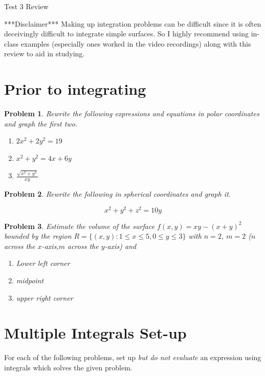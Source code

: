 \documentclass[11pt]{article}
\newtheorem{problem}{Problem}
\newcommand{\vs}{\vspace*{.1in}}
\begin{document}
\begin{huge}
    \begin{center}
        Test 3 Review
    \end{center}
\end{huge}


\vs\vs

***Disclaimer*** Making up integration problems can be difficult since it is often deceivingly difficult to integrate simple surfaces. So I highly recommend using in-class examples (especially ones worked in the video recordings) along with this review to aid in studying.

\section{Prior to integrating}

\begin{problem}
    Rewrite the following expressions and equations in polar coordinates and graph the first two.
    \begin{enumerate}
        \item $2x^2 + 2y^2 = 19$
        \item $x^2+y^2 = 4x+6y$
        \item $\frac{\sqrt{x^2+y^2}}{xy}$
    \end{enumerate}
\end{problem}

\begin{problem}
    Rewrite the following in spherical coordinates and graph it.

\[x^2+y^2+z^2 = 10y\]

\end{problem}






\begin{problem}
Estimate the volume of the surface $f(x,y) = xy-(x+y)^2$ bounded by the region $R = \{(x,y): 1\leq x\leq 5, 0\leq y\leq 3\}$ with $n = 2$, $m=2$ ($n$ across the $x$-axis,$m$ across the $y$-axis) and 
\begin{enumerate}
    \item Lower left corner 
    \item midpoint
    \item upper right corner
\end{enumerate}
\end{problem}

\section{Multiple Integrals Set-up}
For each of the following problems, set up \emph{but do not evaluate} an expression using integrals which solves the given problem.
\end{document}
